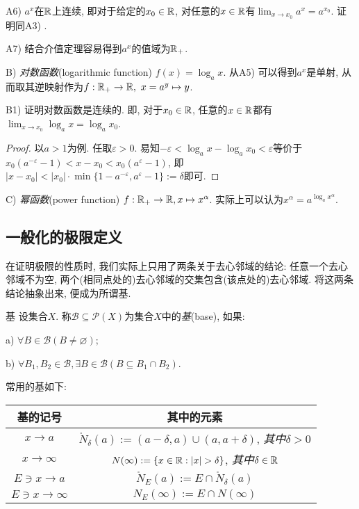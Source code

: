 A6) $a^x$在$\mathbb{R}$上连续, 即对于给定的$x_0 \in \mathbb{R}$, 对任意的$x \in \mathbb{R}$有$\lim_{x \to x_0} a^x = a^{x_0}$. 证明同A3) .

A7) 结合介值定理容易得到$a^x$的值域为$\mathbb{R} _+$. 



\vspace{1em}
B) \textit{对数函数}(logarithmic function) $f(x)=\log_a{x}$. 从A5) 可以得到$a^x$是单射, 从而取其逆映射作为$f:\mathbb{R} _+ \to \mathbb{R} ,~x=a^y \mapsto y$.

B1) 证明对数函数是连续的. 即, 对于$x_0 \in \mathbb{R}$, 任意的$x \in \mathbb{R}$都有$\lim_{x \to x_0} \log_a{x} = \log_a{x_0}$. 

\begin{proof}
	以$a>1$为例. 任取$\varepsilon >0$. 易知$-\varepsilon < \log_a{x} - \log_a{x_0} < \varepsilon$等价于$x_0(a^{-\varepsilon}-1) < x-x_0 < x_0(a^{\varepsilon}-1)$, 即$|x-x_0|<|x_0| \cdot \min \{ 1-a^{-\varepsilon},a^{\varepsilon}-1 \} :=\delta$即可. 
\end{proof}

\vspace{1em}
C) \textit{幂函数}(power function) $f: \mathbb{R} _+ \to \mathbb{R} ,x \mapsto x^{\alpha}$. 实际上可以认为$x^{\alpha} = a^{\log_a{x^{\alpha}}}$. 


\subsection{一般化的极限定义}

在证明极限的性质时, 我们实际上只用了两条关于去心邻域的结论: 任意一个去心邻域不为空, 两个(相同点处的)去心邻域的交集包含(该点处的)去心邻域. 将这两条结论抽象出来, 便成为所谓基.

\begin{definition}{基}
	设集合$X$. 称$\mathcal{B} \subseteq \mathcal{P}(X)$为集合$X$中的\textit{基}(base), 如果: 
	
	a) $\forall B \in \mathcal{B} (B\neq \varnothing)$;
	
	b) $\forall B_1,B_2 \in \mathcal{B} ,\exists B \in \mathcal{B} (B \subseteq B_1 \cap B_2)$. 
\end{definition}

常用的基如下: 

\begin{table}[h]
	\centering
	\renewcommand\arraystretch{1.3}
	\begin{tabular}{cc}
		\toprule
		基的记号           & 其中的元素                    \\
		\midrule
		$x \to a$         & $\mathring{N}_{\delta}(a):=(a-\delta  , a)\cup (a,a+\delta )$, \textit{其中}$\delta >0$      \\
		$x \to \infty$ & $N(\infty) := \{ x\in \R : |x|>\delta \}$, \textit{其中}$\delta \in \mathbb{R}$ \\
		$E \ni x \to a$ & $\mathring{N}_E(a):=E \cap \mathring{N}_{\delta}(a)$          \\
		$E \ni x \to \infty$ & $N_E(\infty) := E \cap N(\infty)$ \\
		\bottomrule
	\end{tabular}
\end{table}

